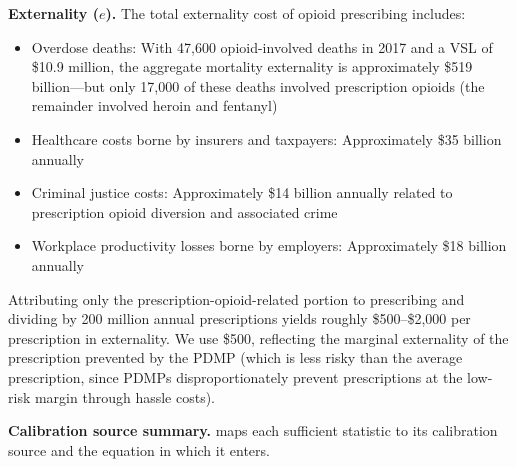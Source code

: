 \documentclass[12pt]{article}
\begin{document}
\textbf{Externality ($e$).} The total externality cost of opioid prescribing includes:
\begin{itemize}
\item Overdose deaths: With 47,600 opioid-involved deaths in 2017 and a VSL of \$10.9 million, the aggregate mortality externality is approximately \$519 billion---but only 17,000 of these deaths involved prescription opioids (the remainder involved heroin and fentanyl)
\item Healthcare costs borne by insurers and taxpayers: Approximately \$35 billion annually
\item Criminal justice costs: Approximately \$14 billion annually related to prescription opioid diversion and associated crime
\item Workplace productivity losses borne by employers: Approximately \$18 billion annually
\end{itemize}

Attributing only the prescription-opioid-related portion to prescribing and dividing by 200 million annual prescriptions yields roughly \$500--\$2,000 per prescription in externality. We use \$500, reflecting the marginal externality of the prescription prevented by the PDMP (which is less risky than the average prescription, since PDMPs disproportionately prevent prescriptions at the low-risk margin through hassle costs).

\textbf{Calibration source summary.}  maps each sufficient statistic to its calibration source and the equation in which it enters.
\end{document}
